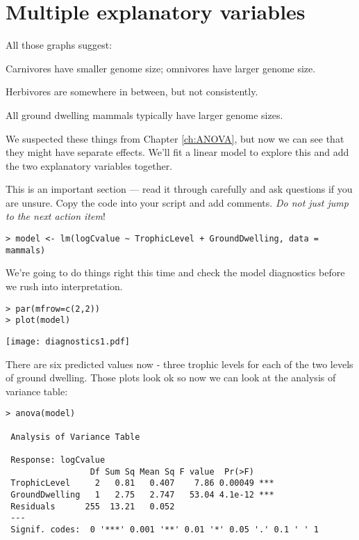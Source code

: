 \section{Multiple explanatory variables}

All those graphs suggest:
\begin{compactitem}
 \item Carnivores have smaller genome size; omnivores have larger genome size. 
 \item Herbivores are somewhere in between, but not consistently.
 \item All ground dwelling mammals typically have larger genome sizes.
\end{compactitem}

We suspected these things from Chapter \ref{ch:ANOVA}, but now we can see 
that they might have separate effects. We'll fit a linear model to 
explore this and add the two explanatory variables together.
  
\begin{compactitem}[$\quad\star$]
\item This is an important section --- read it through carefully and 
ask questions if you are unsure. Copy the code into your script and add 
comments. {\it Do not just jump to the next action item}!
\end{compactitem}

\begin{lstlisting}
> model <- lm(logCvalue ~ TrophicLevel + GroundDwelling, data = mammals)	
\end{lstlisting}

We're going to do things right this time and check the model 
diagnostics before we rush into interpretation.

\begin{lstlisting}
> par(mfrow=c(2,2))
> plot(model)
\end{lstlisting}

\begin{center}
	\texttt{[image: diagnostics1.pdf]}
\end{center} 

There are six predicted values now - three trophic levels for each of 
the two levels of ground dwelling. Those plots look ok so now we can 
look  at the analysis of variance table:

\begin{lstlisting}
> anova(model)

 Analysis of Variance Table
 
 Response: logCvalue
                 Df Sum Sq Mean Sq F value  Pr(>F)    
 TrophicLevel     2   0.81   0.407    7.86 0.00049 ***
 GroundDwelling   1   2.75   2.747   53.04 4.1e-12 ***
 Residuals      255  13.21   0.052                    
 ---
 Signif. codes:  0 '***' 0.001 '**' 0.01 '*' 0.05 '.' 0.1 ' ' 1 
\end{lstlisting}

